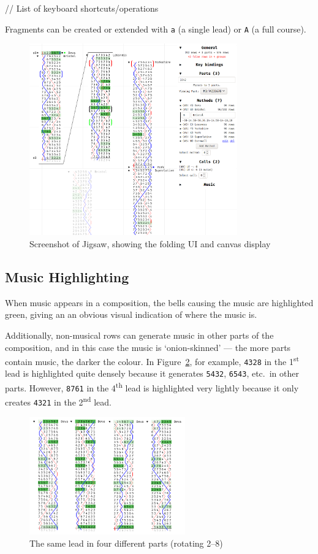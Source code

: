 \documentclass[12pt]{article}
\newcommand{\row}[1]{\texttt{#1}}
\newcommand{\nth}[2]{#1\textsuperscript{#2}}
\begin{document}
// List of keyboard shortcuts/operations

Fragments can be created or extended with \verb|a| (a single lead) or \verb|A| (a full course).

\begin{figure}
    \centering
    \includegraphics[width=0.8\textwidth]{current-screenshot-w-mute}
    \caption{Screenshot of Jigsaw, showing the folding UI and canvas display}\label{fig:cur-screenshot}
\end{figure}

\subsection{Music Highlighting}

When music appears in a composition, the bells causing the music are highlighted green, giving an
an obvious visual indication of where the music is.

Additionally, non-musical rows can generate music in other parts of the composition, and in this
case the music is `onion-skinned' --- the more parts contain music, the darker the colour.  In
Figure~\ref{fig:multi-part-music}, for example, \row{4328} in the \nth{1}{st} lead is highlighted quite
densely because it generates \row{5432}, \row{6543}, etc.\ in other parts.  However, \row{8761} in
the \nth{4}{th} lead is highlighted very lightly because it only creates \row{4321} in the \nth{2}{nd}
lead.

\begin{figure}
    \centering
    \includegraphics[width=0.6\textwidth]{multi-part-music-clean}
    \caption{The same lead in four different parts (rotating 2--8)}\label{fig:multi-part-music}
\end{figure}
\end{document}
